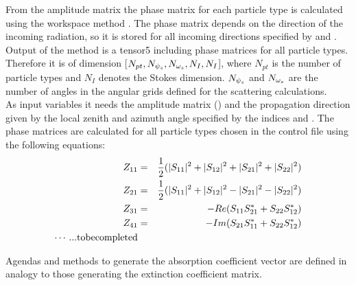 \label{sec:scattering:pha_mat_spt}

From the amplitude matrix the phase matrix for each
particle type is calculated using the workspace method
. The phase matrix depends on the
direction of the incoming radiation, so it is stored for all incoming
directions specified by  and
.\\
Output of the method is a tensor5 including phase matrices for all particle
types. Therefore it is  of  dimension
[$N_{pt}, N_{{\psi_s}}, N_{{\omega_s}}, N_{I}, N_{I}$], where $N_{pt}$ is
the number of particle
types  and $N_{I}$ denotes the Stokes dimension. $N_{{\psi_s}}$ and
$N_{{\omega_s}}$ are the number of angles in the angular grids defined for
the scattering calculations.\\
As input variables it needs the amplitude matrix ()
and the propagation direction given by the local zenith and azimuth
angle specified by the indices  and
.  
The phase matrices \PhaMat{} are
calculated for all particle types chosen in the control
file using the following equations: 
\begin{eqnarray}
   Z_{11} &=& \frac{1}{2}(|S_{11}|^2+|S_{12}|^2+|S_{21}|^2+|S_{22}|^2)\\
   Z_{21} &=& \frac{1}{2}(|S_{11}|^2+|S_{12}|^2-|S_{21}|^2-|S_{22}|^2)\\
   Z_{31} &=& -Re(S_{11}S_{21}^*+S_{22}S_{12}^*)\\
   Z_{41} &=& -Im(S_{21}S_{11}^*+S_{22}S_{12}^*)\\
\cdots ... {\rm to be completed}
\end{eqnarray}






\label{sec:scattering:abs_vec}

Agendas and methods to generate the absorption coefficient vector are
defined in analogy to those generating the extinction coefficient matrix.

\label{sec:scattering:abs_vec_agenda}

